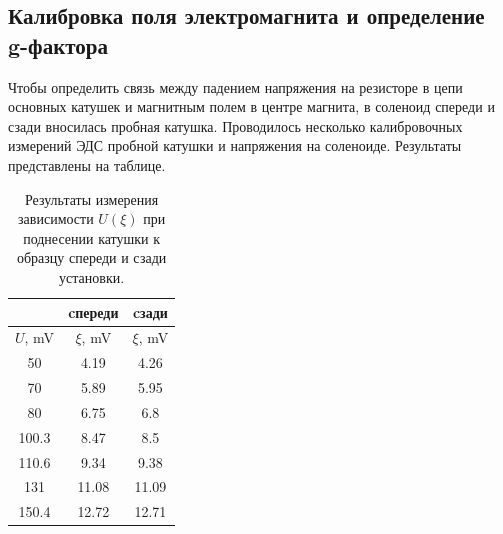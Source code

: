 \documentclass[a4paper, 14pt]{extarticle}%
\newcommand\ECaption[1]{%
     \captionsetup{font=footnotesize}%
     \caption{#1}}
\begin{document}
\subsection*{Калибровка поля электромагнита и определение g-фактора}
Чтобы определить связь между падением напряжения на резисторе в цепи основных
катушек и магнитным полем в центре магнита, в соленоид спереди и сзади вносилась пробная катушка. Проводилось несколько калибровочных измерений ЭДС пробной катушки и напряжения на соленоиде. Результаты представлены на таблице.
\begin{table}[h!]
\begin{center}
\begin{tabular}{|c|c|c|}
\hline
\rowcolor[HTML]{6665CD} 
        & cпереди   & cзади     \\ \hline
\rowcolor[HTML]{9698ED} 
$U$, mV & $\xi$, mV & $\xi$, mV \\ \hline
50      & 4.19      & 4.26      \\ \hline
\rowcolor[HTML]{9698ED} 
70      & 5.89      & 5.95      \\ \hline
80      & 6.75      & 6.8       \\ \hline
\rowcolor[HTML]{9698ED} 
100.3   & 8.47      & 8.5       \\ \hline
110.6   & 9.34      & 9.38      \\ \hline
\rowcolor[HTML]{9698ED} 
131     & 11.08     & 11.09     \\ \hline
150.4   & 12.72     & 12.71     \\ \hline
\end{tabular}
\ECaption{Результаты измерения зависимости $U(\xi)$ при поднесении катушки к образцу спереди и сзади установки.}
\end{center}
\end{table}
\end{document}

